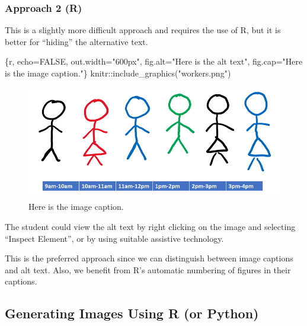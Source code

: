 \documentclass[
  letterpaper,
  oneside]{book}
\newenvironment{Shaded}{\begin{snugshade}}{\end{snugshade}}
\newcommand{\InformationTok}[1]{\textcolor[rgb]{0.37,0.37,0.37}{#1}}
\numberwithin{equation}{section}
\numberwithin{figure}{section}
\theoremstyle{break}
\theoremstyle{plain}
\theoremstyle{remark}
\begin{document}
\subsubsection*{Approach 2 (R)}\label{approach-2-r}

This is a slightly more difficult approach and requires the use of R,
but it is better for ``hiding'' the alternative text.

\begin{Shaded}
\begin{Highlighting}[]
\InformationTok{\textasciigrave{}\textasciigrave{}\textasciigrave{}\{r, echo=FALSE, out.width="600px", fig.alt="Here is the alt text",}
\InformationTok{    fig.cap="Here is the image caption."\}}
\InformationTok{    knitr::include\_graphics("workers.png")}
\InformationTok{\textasciigrave{}\textasciigrave{}\textasciigrave{}}
\end{Highlighting}
\end{Shaded}

\begin{figure}[H]

{\centering \includegraphics[width=6.25in,height=\textheight,keepaspectratio]{workers.png}

}

\caption{Here is the image caption.}

\end{figure}%

The student could view the alt text by right clicking on the image and
selecting ``Inspect Element'', or by using suitable assistive
technology.

This is the preferred approach since we can distinguish between image
captions and alt text. Also, we benefit from R's automatic numbering of
figures in their captions.

\subsection{Generating Images Using R (or
Python)}\label{generating-images-using-r-or-python}
\end{document}
